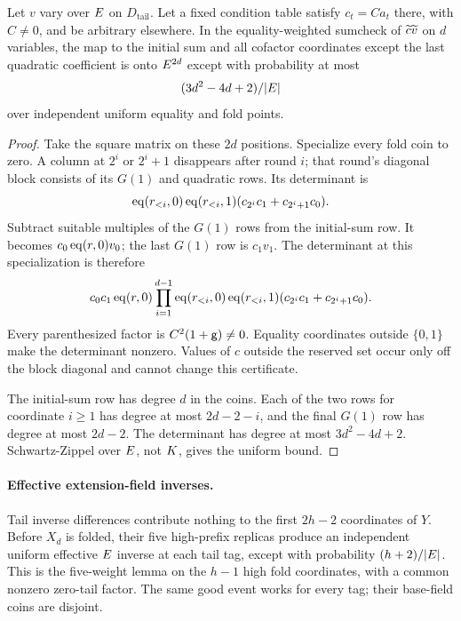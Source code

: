 \begin{lemma}\label{lem:jump-tail}
Let $v$ vary over $E$ on $D_{\mathrm{tail}}$. Let a fixed condition table satisfy $c_t=C a_t$ there, with $C\ne0$, and be arbitrary elsewhere. In the equality-weighted sumcheck of $\widetilde{c}\widetilde{v}$ on $d$ variables, the map to the initial sum and all cofactor coordinates except the last quadratic coefficient is onto $E^{2d}$ except with probability at most
\[
 (3d^2-4d+2)/|E|
\]
over independent uniform equality and fold points.
\end{lemma}
\begin{proof}
Take the square matrix on these $2d$ positions. Specialize every fold coin to zero. A column at $2^i$ or $2^i+1$ disappears after round $i$; that round's diagonal block consists of its $G(1)$ and quadratic rows. Its determinant is
\[
 \operatorname{eq}(r_{<i},0)\operatorname{eq}(r_{<i},1)
       (c_{2^i}c_1+c_{2^i+1}c_0).
\]
Subtract suitable multiples of the $G(1)$ rows from the initial-sum row. It becomes $c_0\operatorname{eq}(r,0)v_0$; the last $G(1)$ row is $c_1v_1$. The determinant at this specialization is therefore
\[
 c_0c_1\operatorname{eq}(r,0)\prod_{i=1}^{d-1}
 \operatorname{eq}(r_{<i},0)\operatorname{eq}(r_{<i},1)
       (c_{2^i}c_1+c_{2^i+1}c_0).
\]
Every parenthesized factor is $C^2(1+\mathsf{g})\ne0$. Equality coordinates outside $\{0,1\}$ make the determinant nonzero. Values of $c$ outside the reserved set occur only off the block diagonal and cannot change this certificate.

The initial-sum row has degree $d$ in the coins. Each of the two rows for coordinate $i\ge1$ has degree at most $2d-2-i$, and the final $G(1)$ row has degree at most $2d-2$. The determinant has degree at most $3d^2-4d+2$. Schwartz-Zippel over $E$, not $K$, gives the uniform bound.
\end{proof}

\paragraph{Effective extension-field inverses.} Tail inverse differences contribute nothing to the first $2h-2$ coordinates of $Y$. Before $X_d$ is folded, their five high-prefix replicas produce an independent uniform effective $E$ inverse at each tail tag, except with probability $(h+2)/|E|$. This is the five-weight lemma on the $h-1$ high fold coordinates, with a common nonzero zero-tail factor. The same good event works for every tag; their base-field coins are disjoint.

